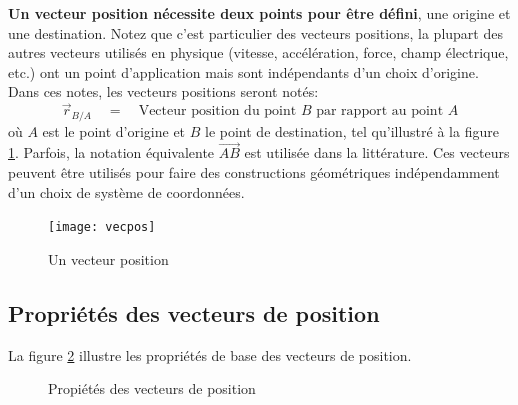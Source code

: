\textbf{Un vecteur position nécessite deux points pour être défini}, une origine et une destination. Notez que c'est particulier des vecteurs positions, la plupart des autres vecteurs utilisés en physique (vitesse, accélération, force, champ électrique, etc.) ont un point d'application mais sont indépendants d'un choix d’origine. Dans ces notes, les vecteurs positions seront notés:
\begin{equation}
\vec{r}_{B/A}  \quad =  \quad \text{Vecteur position du point $B$ par rapport au point $A$}
\end{equation} 
où $A$ est le point d'origine et $B$ le point de destination, tel qu'illustré à la figure \ref{fig:vecpos}. Parfois, la notation équivalente $\vec{AB}$ est utilisée dans la littérature. Ces vecteurs  peuvent être utilisés pour faire des constructions géométriques indépendamment d'un choix de système de coordonnées. 
%
\begin{figure}[htb]
        \centering
				\texttt{[image: vecpos]}
				\caption{Un vecteur position}
				\label{fig:vecpos}
\end{figure}
%

\subsection{Propriétés des vecteurs de position}
\label{sec:vecposprop}
%
La figure \ref{fig:vecposprop} illustre les propriétés de base des vecteurs de position.
%
\begin{figure}[htbp]
        \centering
				\hspace{5pt}
				\hspace{5pt}
        \caption{Propiétés des vecteurs de position}
				\label{fig:vecposprop}
\end{figure}
%
